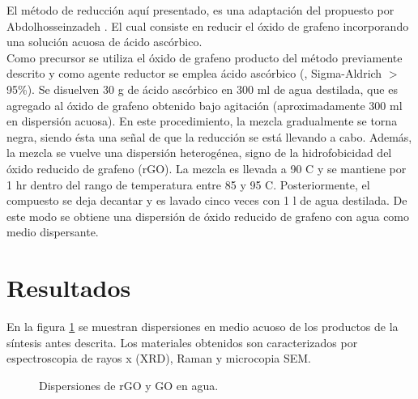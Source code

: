 El método de reducción aquí presentado, es una adaptación del propuesto por Abdolhosseinzadeh \citep{Abdolhosseinzadeh2015}. El cual consiste en reducir el óxido de grafeno incorporando una solución acuosa de ácido ascórbico.
\\
Como precursor se utiliza el óxido de grafeno producto del método previamente descrito y como agente reductor se emplea ácido ascórbico (, Sigma-Aldrich $>$95\%). Se disuelven 30 g de ácido ascórbico en 300 ml de agua destilada, que es agregado al óxido de grafeno obtenido bajo agitación (aproximadamente 300 ml en dispersión acuosa). En este procedimiento, la mezcla gradualmente se torna negra, siendo ésta una señal de que la reducción se está llevando a cabo. Además, la mezcla se vuelve una dispersión heterogénea, signo de la hidrofobicidad del óxido reducido de grafeno (rGO). La mezcla es llevada a 90 \degree C y se mantiene por 1 hr dentro del rango de temperatura entre 85 y 95 \degree C. Posteriormente, el compuesto se deja decantar y es lavado cinco veces con 1 l de agua destilada. De este modo se obtiene una dispersión de óxido reducido de grafeno con agua como medio dispersante.

\section{Resultados}
En la figura \ref{fig:RGOyGO} se muestran dispersiones en medio acuoso de los productos de la síntesis antes descrita.
Los materiales obtenidos son caracterizados por espectroscopia de rayos x (XRD), Raman y microcopia SEM.

\begin{figure}[h]
	\centering
	\caption{Dispersiones de rGO y GO en agua.}
	\label{fig:RGOyGO}
\end{figure}

